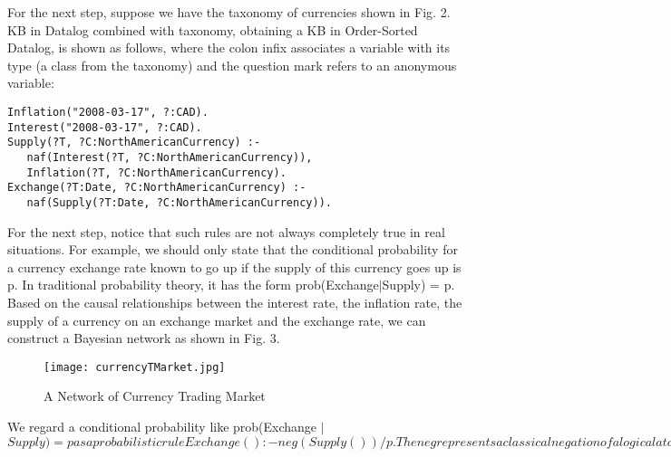 \documentclass [letterpaper] {Article}
\begin{document}
\begin{small}
\vspace{-1.0in} \hspace{0.3in}For the next step, suppose we have the taxonomy of currencies shown in Fig. 2. KB in Datalog combined with taxonomy, obtaining a KB in Order-Sorted Datalog, is shown as follows, where the colon infix associates a variable with its type (a class from the taxonomy) and the question mark refers to an anonymous variable:


\begin{small}
\singlespacing
\begin{verbatim}
Inflation("2008-03-17", ?:CAD).
Interest("2008-03-17", ?:CAD).
Supply(?T, ?C:NorthAmericanCurrency) :- 
   naf(Interest(?T, ?C:NorthAmericanCurrency)), 
   Inflation(?T, ?C:NorthAmericanCurrency).
Exchange(?T:Date, ?C:NorthAmericanCurrency) :-
   naf(Supply(?T:Date, ?C:NorthAmericanCurrency)).
\end{verbatim}
\end{small}

\hspace{0.3in}For the next step, notice that such rules are not always completely true in real situations. For example, we should only state that the conditional probability for a currency exchange rate known to go up if the supply of this currency goes up is p. In traditional probability theory, it has the form prob(Exchange$|$Supply) = p. Based on the causal relationships between the interest rate, the inflation rate, the supply of a currency on an exchange market and the exchange rate, we can construct a Bayesian network as shown in Fig. 3. 

\begin{figure}
\begin{center}
\texttt{[image: currencyTMarket.jpg]}
\caption {A Network of Currency Trading Market}
\vspace{-0.2in}
\label{fig:2Fig3}
\end{center}
\end{figure}

\hspace{0.3in}We regard a conditional probability like prob(Exchange $|$ \neg $Supply) = p as a probabilistic rule 
Exchange() :- neg(Supply()) / p. The neg represents a classical negation of a logical atom. The Bayesian network then becomes a probabilistic KB with the four rows of the Supply table becoming four rules, and the two rows of the Exchange table becoming two rules (in Probabilistic Propositional Logic): $


\end{small}
\end{document}
